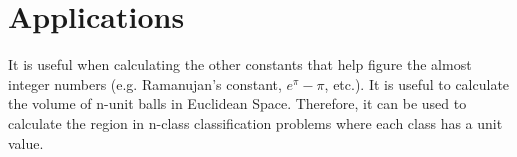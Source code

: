 \documentclass{article}
\begin{document}
\section{Applications}
\begin{flushleft}
\justifying
It is useful when calculating the other constants that help figure the almost integer numbers (e.g. Ramanujan's constant, $e^{\pi} - \pi$, etc.). It is useful to calculate the volume of n-unit balls \cite{nball} in Euclidean Space. Therefore, it can be used to calculate the region in n-class classification problems where each class has a unit value. 
\end{flushleft}

\printbibliography
\end{document}

